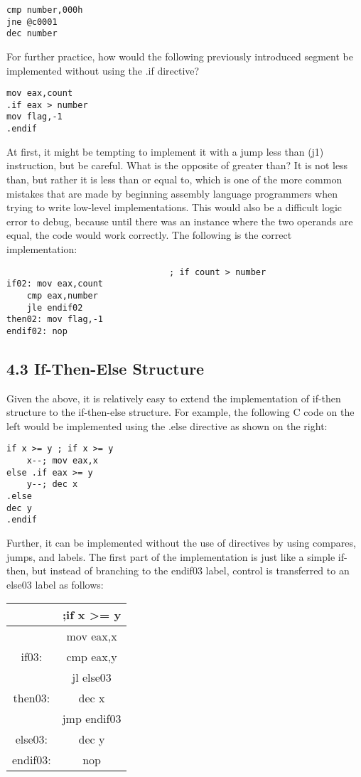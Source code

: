 \documentclass[10pt]{article}
\begin{document}
\begin{verbatim}
cmp number,000h
jne @c0001
dec number
\end{verbatim}

For further practice, how would the following previously introduced segment be implemented without using the .if directive?

\begin{verbatim}
mov eax,count
.if eax > number
mov flag,-1
.endif
\end{verbatim}

At first, it might be tempting to implement it with a jump less than (j1) instruction, but be careful. What is the opposite of greater than? It is not less than, but rather it is less than or equal to, which is one of the more common mistakes that are made by beginning assembly language programmers when trying to write low-level implementations. This would also be a difficult logic error to debug, because until there was an instance where the two operands are equal, the code would work correctly. The following is the correct implementation:

\begin{verbatim}
                                ; if count > number
if02: mov eax,count
    cmp eax,number
    jle endif02
then02: mov flag,-1
endif02: nop
\end{verbatim}

\subsection*{4.3 If-Then-Else Structure}
Given the above, it is relatively easy to extend the implementation of if-then structure to the if-then-else structure. For example, the following C code on the left would be implemented using the .else directive as shown on the right:

\begin{verbatim}
if x >= y ; if x >= y
    x--; mov eax,x
else .if eax >= y
    y--; dec x
.else
dec y
.endif
\end{verbatim}

Further, it can be implemented without the use of directives by using compares, jumps, and labels. The first part of the implementation is just like a simple if-then, but instead of branching to the endif03 label, control is transferred to an else03 label as follows:

\begin{center}
\begin{tabular}{|c|c|}
\hline
 & ;if x >= y \\
\hline
\multirow[t]{3}{*}{if03:} & mov eax,x \\
\hline
 & cmp eax,y \\
\hline
 & jl else03 \\
\hline
then03: & dec x \\
\hline
 & jmp endif03 \\
\hline
else03: & dec y \\
\hline
endif03: & nop \\
\hline
\end{tabular}
\end{center}
\end{document}
